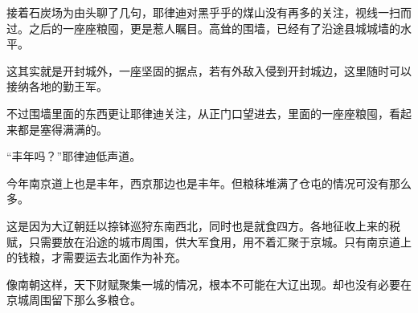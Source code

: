 接着石炭场为由头聊了几句，耶律迪对黑乎乎的煤山没有再多的关注，视线一扫而过。之后的一座座粮囤，更是惹人瞩目。高耸的围墙，已经有了沿途县城城墙的水平。

这其实就是开封城外，一座坚固的据点，若有外敌入侵到开封城边，这里随时可以接纳各地的勤王军。

不过围墙里面的东西更让耶律迪关注，从正门口望进去，里面的一座座粮囤，看起来都是塞得满满的。

“丰年吗？”耶律迪低声道。

今年南京道上也是丰年，西京那边也是丰年。但粮秣堆满了仓屯的情况可没有那么多。

这是因为大辽朝廷以捺钵巡狩东南西北，同时也是就食四方。各地征收上来的税赋，只需要放在沿途的城市周围，供大军食用，用不着汇聚于京城。只有南京道上的钱粮，才需要运去北面作为补充。

像南朝这样，天下财赋聚集一城的情况，根本不可能在大辽出现。却也没有必要在京城周围留下那么多粮仓。


